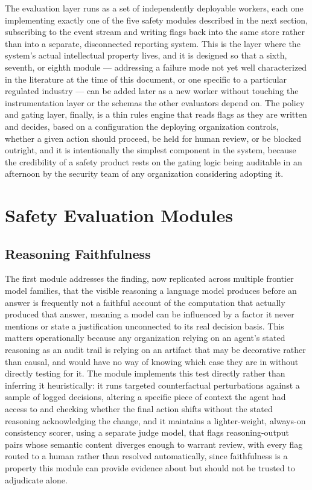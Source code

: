 \documentclass[11pt,a4paper]{article}
\begin{document}
The evaluation layer runs as a set of independently deployable workers, each one implementing exactly one of the five safety modules described in the next section, subscribing to the event stream and writing flags back into the same store rather than into a separate, disconnected reporting system. This is the layer where the system's actual intellectual property lives, and it is designed so that a sixth, seventh, or eighth module --- addressing a failure mode not yet well characterized in the literature at the time of this document, or one specific to a particular regulated industry --- can be added later as a new worker without touching the instrumentation layer or the schemas the other evaluators depend on. The policy and gating layer, finally, is a thin rules engine that reads flags as they are written and decides, based on a configuration the deploying organization controls, whether a given action should proceed, be held for human review, or be blocked outright, and it is intentionally the simplest component in the system, because the credibility of a safety product rests on the gating logic being auditable in an afternoon by the security team of any organization considering adopting it.

\section{Safety Evaluation Modules}

\subsection{Reasoning Faithfulness}

The first module addresses the finding, now replicated across multiple frontier model families, that the visible reasoning a language model produces before an answer is frequently not a faithful account of the computation that actually produced that answer, meaning a model can be influenced by a factor it never mentions or state a justification unconnected to its real decision basis. This matters operationally because any organization relying on an agent's stated reasoning as an audit trail is relying on an artifact that may be decorative rather than causal, and would have no way of knowing which case they are in without directly testing for it. The module implements this test directly rather than inferring it heuristically: it runs targeted counterfactual perturbations against a sample of logged decisions, altering a specific piece of context the agent had access to and checking whether the final action shifts without the stated reasoning acknowledging the change, and it maintains a lighter-weight, always-on consistency scorer, using a separate judge model, that flags reasoning-output pairs whose semantic content diverges enough to warrant review, with every flag routed to a human rather than resolved automatically, since faithfulness is a property this module can provide evidence about but should not be trusted to adjudicate alone.
\end{document}
